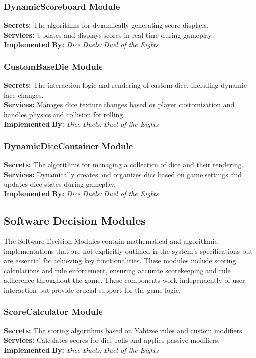 \documentclass[12pt, titlepage]{article}
\begin{document}
\subsubsection{DynamicScoreboard Module}
\textbf{Secrets:} The algorithms for dynamically generating score displays.\\
\textbf{Services:} Updates and displays scores in real-time during gameplay.\\
\textbf{Implemented By:} \textit{Dice Duels: Duel of the Eights}

\subsubsection{CustomBaseDie Module}
\textbf{Secrets:} The interaction logic and rendering of custom dice, including dynamic face changes.\\
\textbf{Services:} Manages dice texture changes based on player customization and handles physics and collision for rolling.\\
\textbf{Implemented By:} \textit{Dice Duels: Duel of the Eights}

\subsubsection{DynamicDiceContainer Module}
\textbf{Secrets:} The algorithms for managing a collection of dice and their rendering.\\
\textbf{Services:} Dynamically creates and organizes dice based on game settings and updates dice states during gameplay.\\
\textbf{Implemented By:} \textit{Dice Duels: Duel of the Eights}

\subsection{Software Decision Modules}
The Software Decision Modules contain mathematical and algorithmic implementations that are not explicitly outlined in the system's specifications but are essential for achieving key functionalities. These modules include scoring calculations and rule enforcement, ensuring accurate scorekeeping and rule adherence throughout the game. These components work independently of user interaction but provide crucial support for the game logic.
\subsubsection{ScoreCalculator Module}
\textbf{Secrets:} The scoring algorithms based on Yahtzee rules and custom modifiers.\\
\textbf{Services:} Calculates scores for dice rolls and applies passive modifiers.\\
\textbf{Implemented By:} \textit{Dice Duels: Duel of the Eights}
\end{document}
